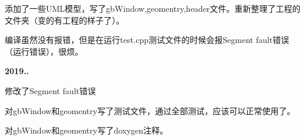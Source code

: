 \begin{DoxyItemize}
\item 添加了一些\+U\+M\+L模型，写了gb\+Window,geomentry,header文件。重新整理了工程的文件夹（变的有工程的样子了）。
\item 编译虽然没有报错，但是在运行test.\+cpp测试文件的时候会报\+Segment fault错误（运行错误），很烦。
\end{DoxyItemize}

{\bfseries{2019..}}


\begin{DoxyItemize}
\item 修改了\+Segment fault错误
\item 对gb\+Window和geomentry写了测试文件，通过全部测试，应该可以正常使用了。
\item 对gb\+Window和geomentry写了doxygen注释。 
\end{DoxyItemize}